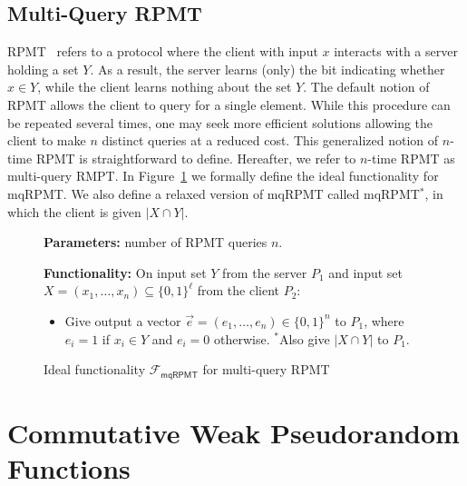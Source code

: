 \documentclass[a4paper,10pt]{article}
\newcommand{\FuncMQRPMT}{\mathcal{F}_\mathsf{mqRPMT}}
\begin{document}
\subsection{Multi-Query RPMT}
RPMT~\cite{KRTW-ASIACRYPT-2019} refers to a protocol where the client with input $x$ 
interacts with a server holding a set $Y$. 
As a result, the server learns (only) the bit indicating whether $x \in Y$, 
while the client learns nothing about the set $Y$. 
The default notion of RPMT allows the client to query for a single element.
While this procedure can be repeated several times, 
one may seek more efficient solutions allowing the client to make $n$ distinct queries at a reduced cost. 
This generalized notion of $n$-time RPMT is straightforward to define. 
Hereafter, we refer to $n$-time RPMT as multi-query RMPT.  
In Figure~\ref{fig:fmqrpmt} we formally define the ideal functionality for mqRPMT. 
We also define a relaxed version of mqRPMT called mqRPMT$^*$, 
in which the client is given $|X \cap Y|$.  
\begin{figure}[!hbtp]
\begin{framed}
\begin{minipage}[center]{\textwidth}
\begin{trivlist}
\item \textbf{Parameters:} number of RPMT queries $n$. 

\item \textbf{Functionality:}
On input set $Y$ from the server $P_1$ 
and input set $X = (x_1, \dots, x_n) \subseteq \{0,1\}^\ell$ from the client $P_2$: 
\begin{itemize}
\item Give output a vector $\vec{e} = (e_1, \dots, e_n) \in \{0,1\}^n$ to $P_1$, 
    where $e_i = 1$ if $x_i \in Y$ and $e_i = 0$ otherwise. 
    $^*$Also give $|X \cap Y|$ to $P_1$.  
\end{itemize}
\end{trivlist}
\end{minipage}
\end{framed}
\caption{Ideal functionality $\FuncMQRPMT$ for multi-query RPMT}\label{fig:fmqrpmt}
\end{figure}

\section{Commutative Weak Pseudorandom Functions}
\end{document}
